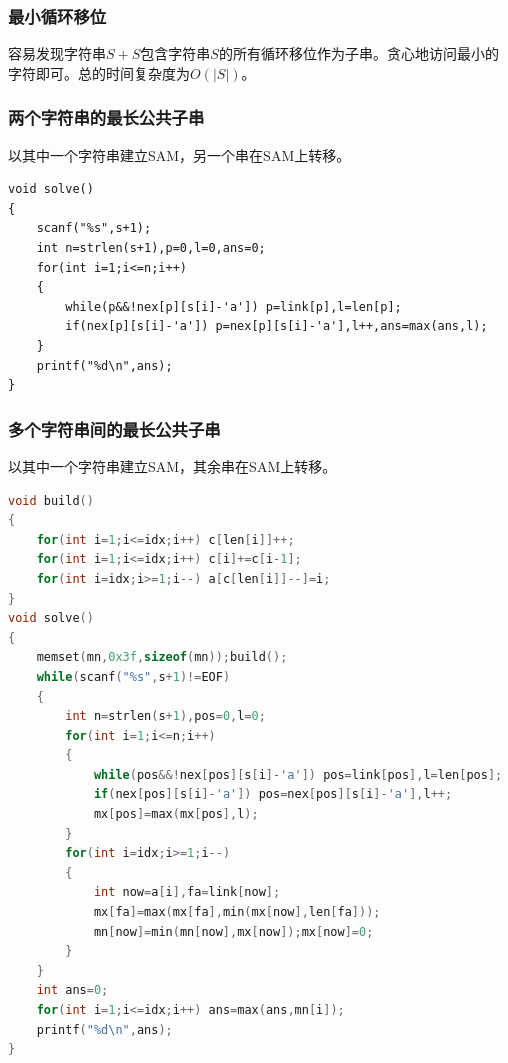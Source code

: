 \documentclass[a4paper]{book}
\begin{document}
\subsubsection{最小循环移位}
容易发现字符串$S+S$包含字符串$S$的所有循环移位作为子串。贪心地访问最小的字符即可。总的时间复杂度为$O(|S|)$。
\subsubsection{两个字符串的最长公共子串}
以其中一个字符串建立SAM，另一个串在SAM上转移。
\begin{lstlisting}
void solve()
{
    scanf("%s",s+1);
    int n=strlen(s+1),p=0,l=0,ans=0;
    for(int i=1;i<=n;i++)
    {
        while(p&&!nex[p][s[i]-'a']) p=link[p],l=len[p];
        if(nex[p][s[i]-'a']) p=nex[p][s[i]-'a'],l++,ans=max(ans,l);
    }
    printf("%d\n",ans);
}
\end{lstlisting}
\subsubsection{多个字符串间的最长公共子串}
以其中一个字符串建立SAM，其余串在SAM上转移。
\begin{lstlisting}[language=c++]
void build()
{
    for(int i=1;i<=idx;i++) c[len[i]]++;
    for(int i=1;i<=idx;i++) c[i]+=c[i-1];
    for(int i=idx;i>=1;i--) a[c[len[i]]--]=i;
}
void solve()
{
    memset(mn,0x3f,sizeof(mn));build();
    while(scanf("%s",s+1)!=EOF)
    {
        int n=strlen(s+1),pos=0,l=0;
        for(int i=1;i<=n;i++)
        {
            while(pos&&!nex[pos][s[i]-'a']) pos=link[pos],l=len[pos];
            if(nex[pos][s[i]-'a']) pos=nex[pos][s[i]-'a'],l++;
            mx[pos]=max(mx[pos],l);
        }
        for(int i=idx;i>=1;i--)
        {
            int now=a[i],fa=link[now];
            mx[fa]=max(mx[fa],min(mx[now],len[fa]));
            mn[now]=min(mn[now],mx[now]);mx[now]=0;
        }
    }
    int ans=0;
    for(int i=1;i<=idx;i++) ans=max(ans,mn[i]);
    printf("%d\n",ans);
}
\end{lstlisting}
\end{document}
